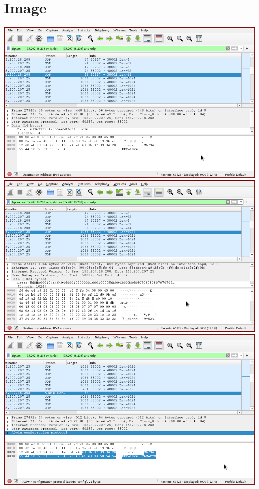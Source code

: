 \documentclass{article}
\begin{document}
\section{Image}
\includegraphics[width=\textwidth]{wireshark3.png}
\includegraphics[width=\textwidth]{wireshark4.png}
\includegraphics[width=\textwidth]{wireshark5.png}
\end{document}
